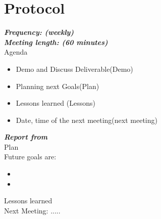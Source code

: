 \documentclass{scrartcl}
\begin{document}
                      
        
    


   

   
    
   
  

\section{Protocol}
\textbf{\textit{Frequency: (weekly) \\
Meeting length: (60 minutes)}}\\

Agenda

\begin{itemize}
  	\item Demo and Discuss Deliverable(Demo)
  	\item Planning next Goals(Plan)
  	\item Lessons learned (Lessons)
  	\item Date, time of the next meeting(next meeting)
 \end{itemize} 	


\textbf{\textit{Report from   }}\\
Plan\\
Future goals are: 
\begin{itemize}


	\item 
	\item 
\end{itemize}	
Lessons learned\\

Next Meeting: .....\\



\end{document}
